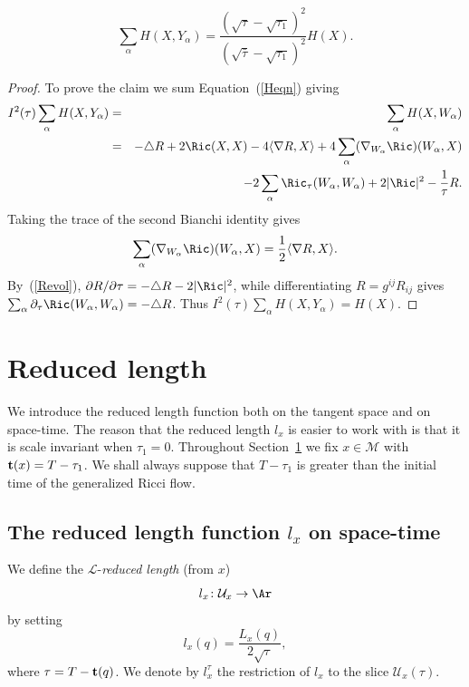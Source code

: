 \begin{claim}\label{claim:h-sum-formula}
\label{Hclaim}
$$\sum_\alpha
H(X,Y_\alpha)=\frac{(\sqrt{\tau}-\sqrt{\tau_1})^2}{(\sqrt{\bar\tau}-\sqrt{\tau_1})^2}H(X).$$
\end{claim}
\begin{proof}
\sketch
{}
To prove the claim we sum Equation~(\ref{Heqn}) giving
\begin{eqnarray*}
I^2(\tau) \sum_{\alpha}H(X,Y_{\alpha}) &= & \sum_\alpha H(X,W_\alpha)
\\
& = & -\triangle R + 2\Ric(X,X) - 4\langle \nabla R,X\rangle
+4\sum_{\alpha}(\nabla_{W_\alpha} \Ric)(W_{\alpha},X) \\ & &
-2\sum_{\alpha}\Ric_{\tau}( W_{\alpha},W_{\alpha}) +2|\Ric|^{2} -\frac{1}{\tau}R.
\end{eqnarray*}
Taking the trace of the second Bianchi identity gives
$$\sum_{\alpha}(\nabla_{W_\alpha}\Ric)(W_{\alpha},X)=\frac{1}{2}\langle\nabla R,X\rangle.$$ By~(\ref{Revol}),
$\partial R/\partial\tau=-\triangle R-2|\Ric|^2$, while differentiating
$R=g^{ij}R_{ij}$ gives $\sum_\alpha\partial_\tau\Ric(W_\alpha,W_\alpha)=-\triangle R$.
Thus $I^2(\tau)\sum_\alpha H(X,Y_\alpha)=H(X)$.
\end{proof}

\section{Reduced length}\label{sect:redln}

We introduce the reduced length function both on the tangent space
and on space-time. The reason that the reduced length $l_x$ is
easier to work with is that it is scale invariant when $\tau_1=0$.
Throughout Section~\ref{sect:redln} we fix $x\in{\mathcal M}$ with
${\bf t}(x)=T-\tau_1$. We shall always suppose that $T-\tau_1$ is
greater than the initial time of the generalized Ricci flow.

\subsection{The reduced length function $l_x$ on space-time}




\begin{definition}\label{def:reduced-length}
We define
 the $\mathcal{L}$-{\sl reduced length} (from $x$)
$$l_x\colon {\mathcal U}_x\to \Ar$$
by setting $$l_x(q)= \frac{L_x(q)}{2\sqrt{\tau}},$$ where $\tau=T-{\bf t}(q)$.
We denote by $l_x^\tau$ the restriction of $l_x$ to the slice ${\mathcal
U}_x(\tau)$.
\end{definition}


